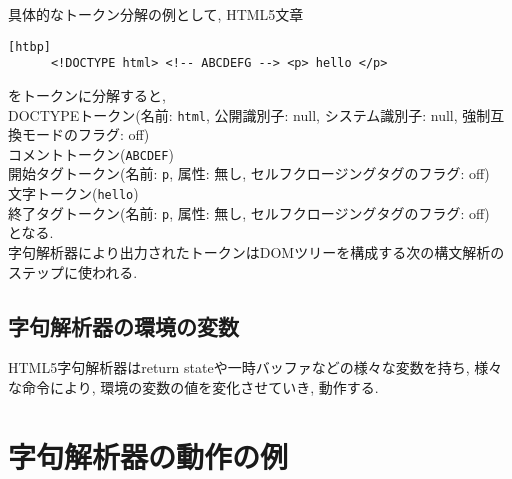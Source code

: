 \documentclass[uplatex,a4j]{jsreport}
\begin{document}
具体的なトークン分解の例として, HTML5文章
\begin{lstlisting}[basicstyle=\ttfamily\footnotesize, frame=single][htbp]
      <!DOCTYPE html> <!-- ABCDEFG --> <p> hello </p>
\end{lstlisting}
をトークンに分解すると, \\
DOCTYPEトークン(名前: \texttt{html}, 公開識別子: null, システム識別子: null, 強制互換モードのフラグ: off)\\
コメントトークン(\texttt{ABCDEF})\\
開始タグトークン(名前: \texttt{p}, 属性: 無し, セルフクロージングタグのフラグ: off)\\
文字トークン(\texttt{hello})\\
終了タグトークン(名前: \texttt{p}, 属性: 無し, セルフクロージングタグのフラグ: off)\\
となる. \\

字句解析器により出力されたトークンはDOMツリーを構成する次の構文解析のステップに使われる.

\subsection*{字句解析器の環境の変数}
HTML5字句解析器はreturn stateや一時バッファなどの様々な変数を持ち, 様々な命令により, 環境の変数の値を変化させていき, 動作する.

\section{字句解析器の動作の例}
\end{document}

